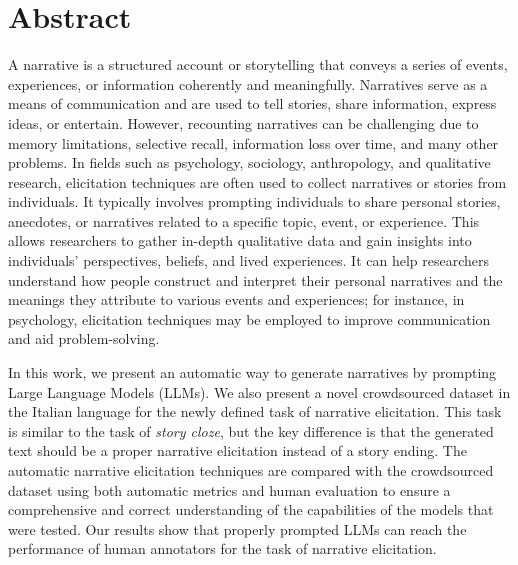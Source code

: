 \chapter*{Abstract} %
\label{abtract}


    A narrative is a structured account or storytelling that conveys a series of events, experiences, or information coherently and meaningfully. Narratives serve as a means of communication and are used to tell stories, share information, express ideas, or entertain. However, recounting narratives can be challenging due to memory limitations, selective recall, information loss over time, and many other problems. In fields such as psychology, sociology, anthropology, and qualitative research, elicitation techniques are often used to collect narratives or stories from individuals. It typically involves prompting individuals to share personal stories, anecdotes, or narratives related to a specific topic, event, or experience. This allows researchers to gather in-depth qualitative data and gain insights into individuals' perspectives, beliefs, and lived experiences. It can help researchers understand how people construct and interpret their personal narratives and the meanings they attribute to various events and experiences; for instance, in psychology, elicitation techniques may be employed to improve communication and aid problem-solving.

In this work, we present an automatic way to generate narratives by prompting Large Language Models (LLMs). We also present a novel crowdsourced dataset in the Italian language for the newly defined task of narrative elicitation. This task is similar to the task of \emph{story cloze}, but the key difference is that the generated text should be a proper narrative elicitation instead of a story ending. The automatic narrative elicitation techniques are compared with the crowdsourced dataset using both automatic metrics and human evaluation to ensure a comprehensive and correct understanding of the capabilities of the models that were tested. Our results show that properly prompted LLMs can reach the performance of human annotators for the task of narrative elicitation.



